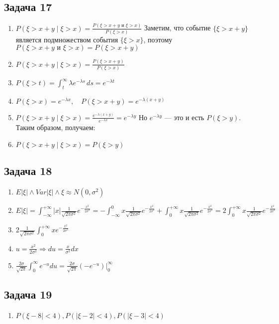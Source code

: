 \documentclass[a4paper,12pt]{article}
\begin{document}
\subsection{Задача 17}
\begin{enumerate}
    \item $   P(\xi > x + y \mid \xi > x) = \frac{P(\xi > x + y \text{ и } \xi > x)}{P(\xi > x)}$    Заметим, что событие \(\{\xi > x + y\}\) является подмножеством события \(\{\xi > x\}\), поэтому \(P(\xi > x + y \text{ и } \xi > x) = P(\xi > x + y)\)
    \item $   P(\xi > x + y \mid \xi > x) = \frac{P(\xi > x + y)}{P(\xi > x)}$
    \item $   P(\xi > t) = \int_t^{\infty} \lambda e^{-\lambda s} \, ds = e^{-\lambda t}$
    \item $   P(\xi > x) = e^{-\lambda x}, \quad P(\xi > x + y) = e^{-\lambda (x+y)}$
    \item $   P(\xi > x + y \mid \xi > x) = \frac{e^{-\lambda (x+y)}}{e^{-\lambda x}} = e^{-\lambda y}$  Но \(e^{-\lambda y}\) — это и есть \(P(\xi > y)\). Таким образом, получаем:
    \item $   P(\xi > x + y \mid \xi > x) = P(\xi > y)$
\end{enumerate}

\subsection{Задача 18}
\begin{enumerate}
    \item $E|\xi|  \land Var|\xi| \land \xi \approx N(0, \sigma^2)$
    \item $E|\xi| = \int_{-\infty}^{+\infty} |x| \frac{1}{\sqrt{2\pi\sigma^2}}e^{-\frac{x^2}{2\sigma^2}} = -\int_{-\infty}^{0} x \frac{1}{\sqrt{2\pi\sigma^2}}e^{-\frac{x^2}{2\sigma^2}} + \int_{0}^{+\infty} x \frac{1}{\sqrt{2\pi\sigma^2}}e^{-\frac{x^2}{2\sigma^2}} = 2\int_{0}^{+\infty} x \frac{1}{\sqrt{2\pi\sigma^2}}e^{-\frac{x^2}{2\sigma^2}}$
    \item $2\frac{1}{\sqrt{2\pi\sigma^2}}\int_{0}^{+\infty} x e^{-\frac{x^2}{2\sigma^2}}$
    \item $u = \frac{x^2}{2\sigma^2} \Rightarrow du = \frac{x}{\sigma^2}dx$
    \item $\frac{2\sigma}{\sqrt{2\pi}} \int_{0}^{\infty}  e^{-u} du = \frac{2\sigma}{\sqrt{2\pi}} (-e^{-u})|_0^{\infty}$
\end{enumerate}

\subsection{Задача 19}
\begin{enumerate}
    \item $P(\xi - 8|<4), P(|\xi-2|<4), P(|\xi-3|<4)$
\end{enumerate}
\end{document}
